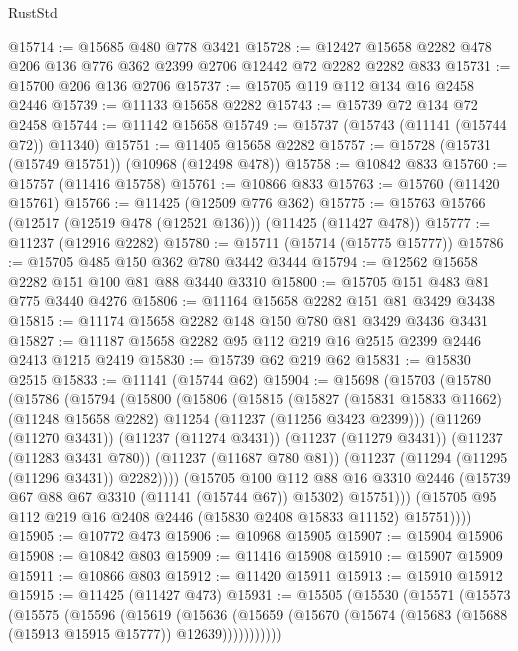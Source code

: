 \begin{lexlean}{RustStd}
\begin{coremodule}
@15714 := @15685 @480 @778 @3421
@15728 := @12427 @15658 @2282 @478 @206 @136 @776 @362 @2399 @2706 @12442 @72 @2282 @2282 @833
@15731 := @15700 @206 @136 @2706
@15737 := @15705 @119 @112 @134 @16 @2458 @2446
@15739 := @11133 @15658 @2282
@15743 := @15739 @72 @134 @72 @2458
@15744 := @11142 @15658
@15749 := @15737 (@15743 (@11141 (@15744 @72)) @11340)
@15751 := @11405 @15658 @2282
@15757 := @15728 (@15731 (@15749 @15751)) (@10968 (@12498 @478))
@15758 := @10842 @833
@15760 := @15757 (@11416 @15758)
@15761 := @10866 @833
@15763 := @15760 (@11420 @15761)
@15766 := @11425 (@12509 @776 @362)
@15775 := @15763 @15766 (@12517 (@12519 @478 (@12521 @136))) (@11425 (@11427 @478))
@15777 := @11237 (@12916 @2282)
@15780 := @15711 (@15714 (@15775 @15777))
@15786 := @15705 @485 @150 @362 @780 @3442 @3444
@15794 := @12562 @15658 @2282 @151 @100 @81 @88 @3440 @3310
@15800 := @15705 @151 @483 @81 @775 @3440 @4276
@15806 := @11164 @15658 @2282 @151 @81 @3429 @3438
@15815 := @11174 @15658 @2282 @148 @150 @780 @81 @3429 @3436 @3431
@15827 := @11187 @15658 @2282 @95 @112 @219 @16 @2515 @2399 @2446 @2413 @1215 @2419
@15830 := @15739 @62 @219 @62
@15831 := @15830 @2515
@15833 := @11141 (@15744 @62)
@15904 := @15698
    (@15703
      (@15780
        (@15786
          (@15794
            (@15800
              (@15806
                (@15815
                  (@15827
                    (@15831 @15833 @11662)
                    (@11248 @15658 @2282)
                    @11254
                    (@11237 (@11256 @3423 @2399)))
                  (@11269 (@11270 @3431))
                  (@11237 (@11274 @3431))
                  (@11237 (@11279 @3431))
                  (@11237 (@11283 @3431 @780))
                  (@11237 (@11687 @780 @81))
                  (@11237 (@11294 (@11295 (@11296 @3431)) @2282))))
              (@15705
                @100
                @112
                @88
                @16
                @3310
                @2446
                (@15739 @67 @88 @67 @3310 (@11141 (@15744 @67)) @15302)
                @15751)))
          (@15705 @95 @112 @219 @16 @2408 @2446 (@15830 @2408 @15833 @11152) @15751))))
@15905 := @10772 @473
@15906 := @10968 @15905
@15907 := @15904 @15906
@15908 := @10842 @803
@15909 := @11416 @15908
@15910 := @15907 @15909
@15911 := @10866 @803
@15912 := @11420 @15911
@15913 := @15910 @15912
@15915 := @11425 (@11427 @473)
@15931 := @15505
    (@15530
      (@15571
        (@15573
          (@15575
            (@15596
              (@15619
                (@15636
                  (@15659 (@15670 (@15674 (@15683 (@15688 (@15913 @15915 @15777)) @12639)))))))))))

\end{coremodule}
\end{lexlean}
